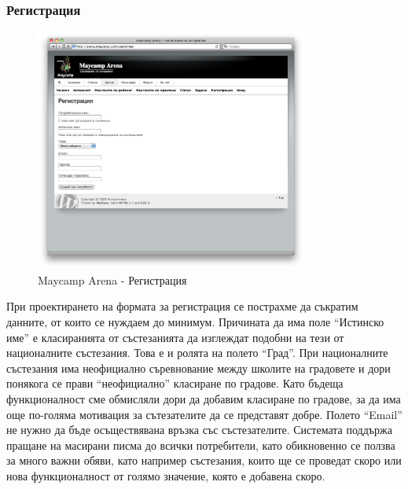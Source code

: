 \documentclass[a4paper,12pt]{article}
\begin{document}
  \subsubsection{Регистрация}
  \begin{figure}[ht]
    \begin{center}
      \includegraphics[width=0.8\textwidth]{maycamp_arena_register.png}
    \end{center}
    \caption{Maycamp Arena - Регистрация}
    \label{arena_register}
  \end{figure}
  При проектирането на формата за регистрация се пострахме да съкратим данните, от които се нуждаем до минимум. Причината да има поле ``Истинско име'' е класиранията от състезанията да изглеждат подобни на тези от националните състезания. Това е и ролята на полето ``Град''. При националните състезания има неофициално съревнование между школите на градовете и дори понякога се прави ``неофициално'' класиране по градове. Като бъдеща функционалност сме обмисляли дори да добавим класиране по градове, за да има още по-голяма мотивация за сътезателите да се представят добре.
  Полето ``Email'' не нужно да бъде осъществявана връзка със състезателите. Системата поддържа пращане на масирани писма до всички потребители, като обикновенно се ползва за много важни обяви, като например състезания, които ще се проведат скоро или нова функционалност от голямо значение, която е добавена скоро.
    
\end{document}
